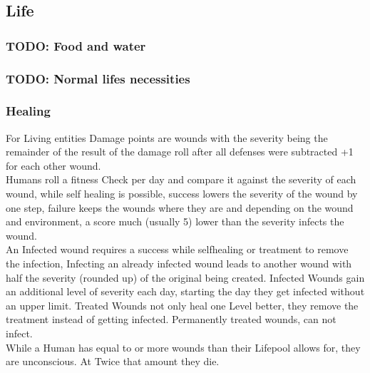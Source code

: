 \documentclass{article}
\begin{document}
    \subsection{Life}
    \subsubsection{TODO: Food and water}
    \subsubsection{TODO: Normal lifes necessities}
    \subsubsection{Healing}
    For Living entities Damage points are wounds with the severity being the remainder of the result of the damage roll
    after all defenses were subtracted +1 for each other wound.\\
    Humans roll a fitness Check per day and compare it against the severity of each wound, while self healing is
    possible, success lowers the severity of the wound by one step, failure keeps the wounds where they are and
    depending on the wound and environment, a score much (usually 5) lower than the severity infects the wound.\\
    An Infected wound requires a success while selfhealing or treatment to remove the infection, Infecting an already
    infected wound leads to another wound with half the severity (rounded up) of the original being created. Infected
    Wounds gain an additional level of  severity each day, starting the day they get infected without an upper limit.
    Treated Wounds not only heal one Level better, they remove the treatment instead of getting infected. Permanently
    treated wounds, can not infect. \\
    While a Human has equal to or more wounds than their Lifepool allows for, they are unconscious. At Twice that amount
    they die.
\end{document}
